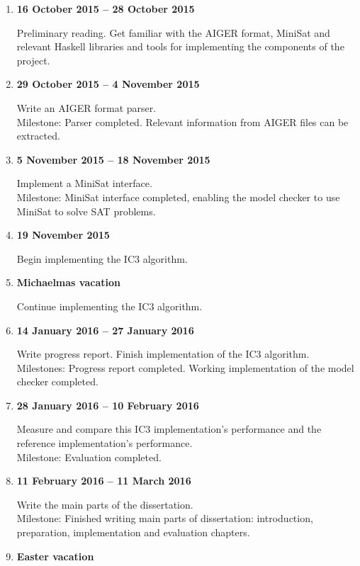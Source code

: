 \documentclass[12pt,a4paper,twoside]{article}
\begin{document}
\begin{enumerate}

\item {\bf 16 October 2015 -- 28 October 2015}

Preliminary reading. Get familiar with the AIGER format, MiniSat and
relevant Haskell libraries and tools for implementing the components
of the project.

\item {\bf 29 October 2015 -- 4 November 2015}

Write an AIGER format parser.
\\
Milestone: Parser completed. Relevant information from
AIGER files can be extracted.

\item {\bf 5 November 2015 -- 18 November 2015}

Implement a MiniSat interface.
\\
Milestone: MiniSat interface completed, enabling the model checker to use
MiniSat to solve SAT problems.

\item {\bf 19 November 2015}

Begin implementing the IC3 algorithm.

\item {\bf Michaelmas vacation}

Continue implementing the IC3 algorithm.

\item {\bf 14 January 2016 -- 27 January 2016}

Write progress report. Finish implementation of the IC3 algorithm.
\\
Milestones: Progress report completed.
Working implementation of the model checker completed.

\item {\bf 28 January 2016 -- 10 February 2016}

Measure and compare this IC3 implementation's performance and the reference
implementation's performance.
\\
Milestone: Evaluation completed.

\item {\bf 11 February 2016 -- 11 March 2016}

Write the main parts of the dissertation.
\\
Milestone:
Finished writing main parts of dissertation: introduction, preparation,
implementation and evaluation chapters.

\item {\bf Easter vacation}


\end{enumerate}
\end{document}
